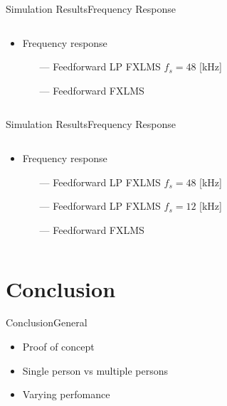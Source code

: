 \begin{frame}{Simulation Results}{Frequency Response}		
\begin{columns}
	\begin{column}{0.4\textwidth}
		\begin{itemize}
			\item Frequency response
			\begin{itemize}
				\item[\textcolor{MATLABorange}{---}] Feedforward LP FXLMS $f_s= 48$ [kHz]  
				\item[\textcolor{MATLABblue}{---}] Feedforward FXLMS 
			\end{itemize}
		\end{itemize}
	\end{column}
	\begin{column}{0.6\textwidth} 
		\resizebox{0.9\columnwidth}{!}{		
			}
	\end{column}
\end{columns}
\end{frame}


\begin{frame}{Simulation Results}{Frequency Response}		
\begin{columns}
	\begin{column}{0.4\textwidth}
		\begin{itemize}
			\item Frequency response
			\begin{itemize}
				\item[\textcolor{MATLABorange}{---}] Feedforward LP FXLMS $f_s= 48$ [kHz]
				\item[\textcolor{MATLABblue}{---}] Feedforward LP FXLMS $f_s= 12$ [kHz]  
				\item[\textcolor{MATLABblue}{---}] Feedforward FXLMS  
			\end{itemize}
		\end{itemize}
	\end{column}
	\begin{column}{0.6\textwidth} 
		\resizebox{0.9\columnwidth}{!}{		
			}
	\end{column}
\end{columns}
\end{frame}




\section{Conclusion}
\begin{frame}{Conclusion}{General}		
\begin{itemize}
\item Proof of concept
\item Single person vs multiple persons
\item Varying perfomance
\end{itemize}
\end{frame}

